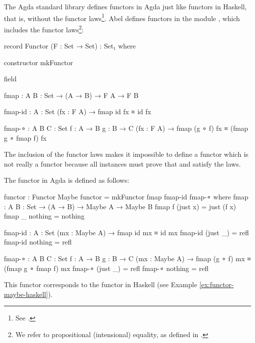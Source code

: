 The Agda standard library defines functors in Agda just like functors
in Haskell, that is, without the functor laws\footnote{See
  \parencite[module ]{danielsson-2013}.}.
Abel defines functors in the module ,
which includes the functor laws\footnote{We refer to propositional
  (intensional) equality, as defined in \parencite[module
    ]{danielsson-2013}.}:
\begin{codeagda}
record Functor (F : Set → Set) : Set₁ where

  constructor mkFunctor

  field

    fmap    : {A B : Set} → (A → B) → F A → F B

    fmap-id : {A : Set} (fx : F A) → fmap id fx ≡ id fx

    fmap-∘  : {A B C : Set} {f : A → B} {g : B → C}
              (fx : F A) → fmap (g ∘ f) fx ≡ (fmap g ∘ fmap f) fx
\end{codeagda}
The inclusion of the functor laws makes it impossible to define a
functor which is not really a functor because all instances must prove
that  and  satisfy the laws.


\begin{example}
  \label{ex:functor-maybe-agda}

  The  functor in Agda is defined as follows:
  \begin{codeagda}
functor : Functor Maybe
functor = mkFunctor fmap fmap-id fmap-∘
  where
    fmap : {A B : Set} → (A → B) → Maybe A → Maybe B
    fmap f (just x) = just (f x)
    fmap _ nothing  = nothing

    fmap-id : {A : Set} (mx : Maybe A) → fmap id mx ≡ id mx
    fmap-id (just _) = refl
    fmap-id nothing  = refl

    fmap-∘ : {A B C : Set} {f : A → B} {g : B → C}
             (mx : Maybe A) → fmap (g ∘ f) mx ≡ (fmap g ∘ fmap f) mx
    fmap-∘ (just _) = refl
    fmap-∘ nothing  = refl
  \end{codeagda}
  This functor corresponds to the  functor in
  Haskell (see Example \ref{ex:functor-maybe-haskell}). 

\end{example}

